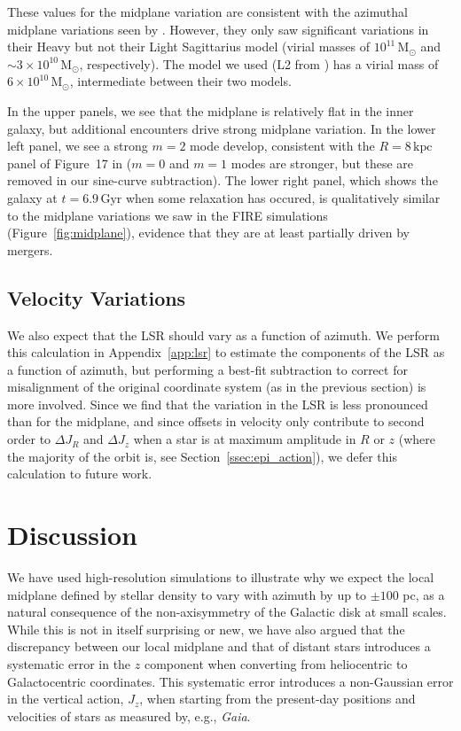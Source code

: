 \documentclass[twocolumn]{aastex62}
\newcommand{\Msun}{\ensuremath{\text{M}_\odot}}
\newcommand{\kpc}{\text{kpc}}
\newcommand{\Gyr}{\text{Gyr}}
\begin{document}
These values for the midplane variation are consistent with the azimuthal
midplane variations seen by \citet{2013MNRAS.429..159G}. However, they only
saw significant variations in their Heavy but not their Light Sagittarius model (virial masses of $10^{11}\,\Msun$ and
$\sim3\times10^{10}\,\Msun$, respectively). The model we used (L2 from
\citet{2018MNRAS.481..286L}) has a virial mass of $6\times10^{10}\,\Msun$, intermediate between their two models.

In the upper panels, we see that the midplane is relatively flat in the inner
galaxy, but additional encounters drive strong midplane variation. In the
lower left panel, we see a strong $m=2$ mode develop, consistent with the
$R=8\,\kpc$ panel of Figure~17 in \citet{2018MNRAS.481..286L} ($m=0$ and $m=1$ modes are stronger, but these
are removed in our sine-curve subtraction). The lower right
panel, which shows the galaxy at $t=6.9\,\Gyr$ when some relaxation has occured, is
qualitatively similar to the midplane variations we saw in the FIRE
simulations (Figure~\ref{fig:midplane}), evidence that they are at least
partially driven by mergers.

\subsection{Velocity Variations} \label{ssec:lsr_var}
We also expect that the LSR should vary as a function of azimuth. We perform
this calculation in Appendix~\ref{app:lsr} to estimate the components of the
LSR as a function of azimuth, but performing a best-fit subtraction to correct
for misalignment of the original coordinate system (as in the previous
section) is more involved. Since we find that the variation in the LSR is less
pronounced than for the midplane, and since offsets in velocity only
contribute to second order to $\Delta J_R$ and $\Delta J_z$ when a star is at
maximum amplitude in $R$ or $z$ (where the majority of the orbit is, see
Section~\ref{ssec:epi_action}), we defer this calculation to future work.

\section{Discussion} \label{sec:discussion}
We have used high-resolution simulations to illustrate 
why
we expect the local midplane defined by stellar density to vary with azimuth by up to $\pm
100$ pc, as a natural consequence of the non-axisymmetry of the Galactic disk
at small scales. While this is not in itself surprising or new, we have also
argued
that the discrepancy between our local midplane and that of distant
stars introduces a systematic error in the $z$ component when converting from
heliocentric to Galactocentric coordinates. This systematic error introduces a
non-Gaussian error in the vertical action, $J_z$, when starting from the
present-day positions and velocities of stars as measured by, e.g.,
\textit{Gaia}.
\end{document}
